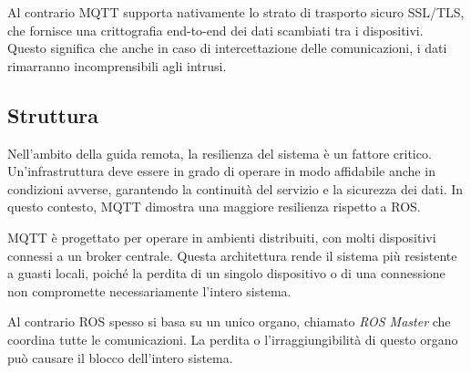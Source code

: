 \noindent Al contrario MQTT supporta nativamente lo strato di trasporto sicuro SSL/TLS, che fornisce una crittografia end-to-end dei dati scambiati tra i dispositivi. Questo significa che anche in caso di intercettazione delle comunicazioni, i dati rimarranno incomprensibili agli intrusi.

\subsection{Struttura}
Nell'ambito della guida remota, la resilienza del sistema è un fattore critico. Un'infrastruttura deve essere in grado di operare in modo affidabile anche in condizioni avverse, garantendo la continuità del servizio e la sicurezza dei dati. In questo contesto, MQTT dimostra una maggiore resilienza rispetto a ROS. 

\noindent MQTT è progettato per operare in ambienti distribuiti, con molti dispositivi connessi a un broker centrale. Questa architettura rende il sistema più resistente a guasti locali, poiché la perdita di un singolo dispositivo o di una connessione non compromette necessariamente l'intero sistema.

\noindent Al contrario ROS spesso si basa su un unico organo, chiamato \textit{ROS Master} che coordina tutte le comunicazioni. La perdita o l'irraggiungibilità di questo organo può causare il blocco dell'intero sistema.
